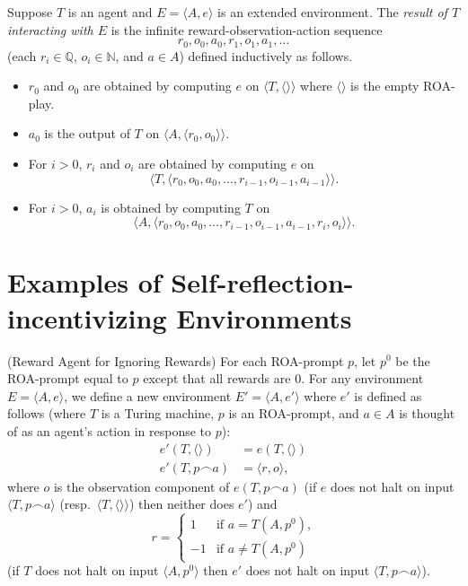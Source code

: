 \documentclass[runningheads]{llncs}
\begin{document}
\begin{definition}
    Suppose $T$ is an agent and $E=\langle A,e\rangle$ is an extended environment.
    The \emph{result of $T$ interacting with $E$} is the infinite
    reward-observation-action sequence
    \[r_0,o_0,a_0,r_1,o_1,a_1,\ldots\]
    (each $r_i\in\mathbb Q$, $o_i\in\mathbb N$, and $a\in A$)
    defined inductively as follows.
    \begin{itemize}
        \item $r_0$ and $o_0$ are obtained by computing $e$ on $\langle T,\langle\rangle\rangle$
        where $\langle\rangle$ is the empty ROA-play.
        \item $a_0$ is the output of $T$ on $\langle A, \langle r_0,o_0\rangle\rangle$.
        \item For $i>0$, $r_i$ and $o_i$ are obtained by computing $e$
        on
        \[\langle T,\langle r_0,o_0,a_0,\ldots,r_{i-1},o_{i-1},a_{i-1}\rangle\rangle.\]
        \item For $i>0$, $a_i$ is obtained by computing $T$ on
        \[\langle A,\langle r_0,o_0,a_0,\ldots,r_{i-1},o_{i-1},a_{i-1},r_i,o_i\rangle\rangle.\]
    \end{itemize}
\end{definition}

\section{Examples of Self-reflection-incentivizing Environments}

\begin{example}
\label{rewardagentforignoringrewardsexample}
    (Reward Agent for Ignoring Rewards)
    For each ROA-prompt $p$, let $p^0$ be the ROA-prompt equal to $p$ except that
    all rewards are $0$.
    For any environment $E=\langle A,e\rangle$, we define a new environment
    $E'=\langle A,e'\rangle$ where $e'$ is defined as follows
    (where $T$ is a Turing machine, $p$ is an ROA-prompt, and $a\in A$ is thought of as
    an agent's action in response to $p$):
    \begin{align*}
        e'(T,\langle\rangle) &= e(T,\langle\rangle)\\
        e'(T,p\frown a)
        &= \langle r,o\rangle,
    \end{align*}
    where $o$ is the observation component of
    $e(T,p\frown a)$ (if $e$ does not halt on input $\langle T,p\frown a\rangle$
    (resp.\ $\langle T,\langle\rangle\rangle$)
    then neither does $e'$) and
    \[
        r =
        \begin{cases}
            1 & \mbox{if $a=T(A,p^0)$,}\\
            -1 & \mbox{if $a\not=T(A,p^0)$}
        \end{cases}
    \]
    (if $T$ does not halt on input $\langle A,p^0\rangle$ then $e'$ does not halt on input
    $\langle T,p\frown a\rangle$).
\end{example}
\end{document}
